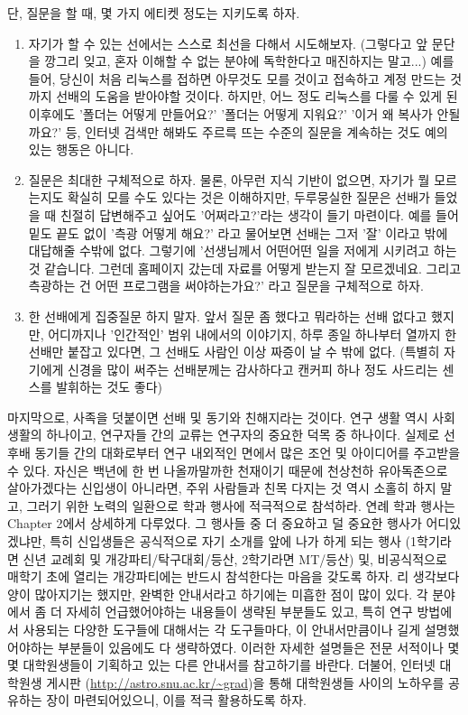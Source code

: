 단, 질문을 할 때, 몇 가지 에티켓 정도는 지키도록 하자.
\begin{enumerate}
\item 자기가 할 수 있는 선에서는 스스로 최선을 다해서 시도해보자. (그렇다고 앞
  문단을 깡그리 잊고, 혼자 이해할 수 없는 분야에 독학한다고 매진하지는 말고...)
  예를 들어, 당신이 처음 리눅스를 접하면 아무것도 모를 것이고 접속하고 계정
  만드는 것까지 선배의 도움을 받아야할 것이다. 하지만, 어느 정도 리눅스를 다룰 수
  있게 된 이후에도 '폴더는 어떻게 만들어요?' '폴더는 어떻게 지워요?' '이거 왜
  복사가 안될까요?' 등, 인터넷 검색만 해봐도 주르륵 뜨는 수준의 질문을 계속하는
  것도 예의 있는 행동은 아니다.
\item 질문은 최대한 구체적으로 하자. 물론, 아무런 지식 기반이 없으면, 자기가 뭘
  모르는지도 확실히 모를 수도 있다는 것은 이해하지만, 두루뭉실한 질문은 선배가
  들었을 때 친절히 답변해주고 싶어도 '어쩌라고?'라는 생각이 들기 마련이다.  예를
  들어 밑도 끝도 없이 '측광 어떻게 해요?' 라고 물어보면 선배는 그저 '잘' 이라고
  밖에 대답해줄 수밖에 없다. 그렇기에 '선생님께서 어떤어떤 일을 저에게 시키려고
  하는 것 같습니다. 그런데 홈페이지 갔는데 자료를 어떻게 받는지 잘
  모르겠네요. 그리고 측광하는 건 어떤 프로그램을 써야하는가요?' 라고 질문을
  구체적으로 하자.
\item 한 선배에게 집중질문 하지 말자. 앞서 질문 좀 했다고 뭐라하는 선배 없다고
  했지만, 어디까지나 '인간적인' 범위 내에서의 이야기지, 하루 종일 하나부터 열까지
  한 선배만 붙잡고 있다면, 그 선배도 사람인 이상 짜증이 날 수 밖에 없다.  (특별히
  자기에게 신경을 많이 써주는 선배분께는 감사하다고 캔커피 하나 정도 사드리는
  센스를 발휘하는 것도 좋다)
\end{enumerate}
\vspace{\baselineskip}

마지막으로, 사족을 덧붙이면 선배 및 동기와 친해지라는 것이다. 연구 생활 역시 사회
생활의 하나이고, 연구자들 간의 교류는 연구자의 중요한 덕목 중 하나이다. 실제로
선후배 동기들 간의 대화로부터 연구 내외적인 면에서 많은 조언 및 아이디어를
주고받을 수 있다. 자신은 백년에 한 번 나올까말까한 천재이기 때문에 천상천하
유아독존으로 살아가겠다는 신입생이 아니라면, 주위 사람들과 친목 다지는 것 역시
소홀히 하지 말고, 그러기 위한 노력의 일환으로 학과 행사에 적극적으로
참석하라. 연례 학과 행사는 Chapter 2에서 상세하게 다루었다. 그 행사들 중 더
중요하고 덜 중요한 행사가 어디있겠냐만, 특히 신입생들은 공식적으로 자기 소개를
앞에 나가 하게 되는 행사 (1학기라면 신년 교례회 및 개강파티/탁구대회/등산,
2학기라면 MT/등산) 및, 비공식적으로 매학기 초에 열리는 개강파티에는 반드시
참석한다는 마음을 갖도록 하자.  \vspace{\baselineskip} 리 생각보다 양이
많아지기는 했지만, 완벽한 안내서라고 하기에는 미흡한 점이 많이 있다. 각 분야에서
좀 더 자세히 언급했어야하는 내용들이 생략된 부분들도 있고, 특히 연구 방법에서
사용되는 다양한 도구들에 대해서는 각 도구들마다, 이 안내서만큼이나 길게
설명했어야하는 부분들이 있음에도 다 생략하였다. 이러한 자세한 설명들은 전문
서적이나 몇몇 대학원생들이 기획하고 있는 다른 안내서를 참고하기를
바란다. 더불어, 인터넷 대학원생 게시판 (\url{http://astro.snu.ac.kr/~grad})을
통해 대학원생들 사이의 노하우를 공유하는 장이 마련되어있으니, 이를 적극
활용하도록 하자.  \vspace{\baselineskip}

